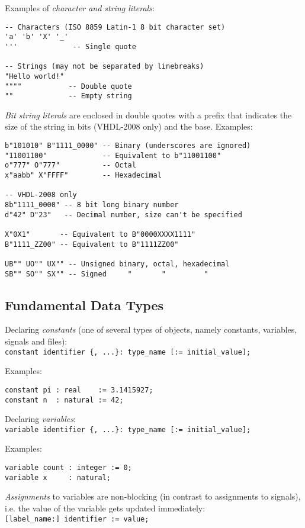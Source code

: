 \documentclass[fontsize=11pt,a4paper]{scrartcl}
\begin{document}
Examples of \emph{character and string literals}:
\begin{lstlisting}
-- Characters (ISO 8859 Latin-1 8 bit character set)
'a' 'b' 'X' '_'
'''             -- Single quote

-- Strings (may not be separated by linebreaks)
"Hello world!"
""""           -- Double quote
""             -- Empty string
\end{lstlisting}

\newpage
\emph{Bit string literals} are enclosed in double quotes with a prefix that indicates the size of the string in bits (\textsc{VHDL-2008} only) and the base. Examples:
\begin{lstlisting}
b"101010" B"1111_0000" -- Binary (underscores are ignored)
"11001100"             -- Equivalent to b"11001100"
o"777" O"777"          -- Octal
x"aabb" X"FFFF"        -- Hexadecimal

-- VHDL-2008 only
8b"1111_0000" -- 8 bit long binary number
d"42" D"23"   -- Decimal number, size can't be specified

X"0X1"       -- Equivalent to B"0000XXXX1111"
B"1111_ZZ00" -- Equivalent to B"1111ZZ00"

UB"" UO"" UX"" -- Unsigned binary, octal, hexadecimal
SB"" SO"" SX"" -- Signed     "       "         "
\end{lstlisting}
%
%
%
%
\subsection{Fundamental Data Types}
Declaring \emph{constants} (one of several types of objects, namely constants, variables, signals and files):\\ \lstinline!constant identifier {, ...}: type_name [:= initial_value];!

Examples:
\begin{lstlisting}
constant pi : real    := 3.1415927;
constant n  : natural := 42;
\end{lstlisting}

Declaring \emph{variables}:\\ \lstinline!variable identifier {, ...}: type_name [:= initial_value];!

Examples:
\begin{lstlisting}
variable count : integer := 0;
variable x     : natural;
\end{lstlisting}

\emph{Assignments} to variables are non-blocking (in contrast to assignments to signals), i.e. the value of the variable gets updated immediately:\\ \lstinline![label_name:] identifier := value;!
\end{document}
